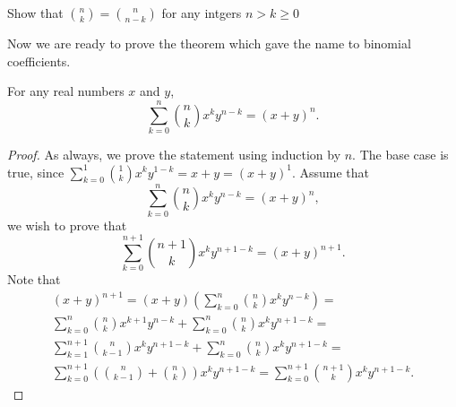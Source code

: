 \begin{exercise}
  Show that $\binom{n}{k} = \binom{n}{n - k}$ for any intgers $n > k \ge 0$
\end{exercise}


Now we are ready to prove the theorem which gave the name to binomial
coefficients.
\begin{theorem}
  For any real numbers $x$ and $y$,
    \[
      \sum_{k = 0}^n \binom{n}{k} x^k y^{n - k} = (x + y)^n.
    \]
\end{theorem}
\begin{proof}
  As always, we prove the statement using induction by $n$. The base case is
  true, since $\sum_{k = 0}^1 \binom{1}{k} x^k y^{1 - k} = x + y =
  (x + y)^1$. Assume that
  \[
    \sum_{k = 0}^n \binom{n}{k} x^k y^{n - k} = (x + y)^n,
  \]
  we wish to prove that
  \[
    \sum_{k = 0}^{n + 1} \binom{n + 1}{k} x^k y^{n + 1 - k} =
      (x + y)^{n + 1}.
  \]
  Note that
  \begin{multline*}
    (x + y)^{n + 1} = (x + y)
      \left(
        \sum_{k = 0}^n \binom{n}{k} x^k y^{n - k}
      \right) = \\
    \sum_{k = 0}^n \binom{n}{k} x^{k + 1} y^{n - k} +
      \sum_{k = 0}^n \binom{n}{k} x^{k} y^{n + 1 - k} = \\
    \sum_{k = 1}^{n + 1} \binom{n}{k - 1} x^k y^{n + 1 - k} +
      \sum_{k = 0}^n \binom{n}{k} x^k y^{n + 1 - k} = \\
    \sum_{k = 0}^{n + 1}
      \left(
        \binom{n}{k - 1} + \binom{n}{k}
      \right)
      x^k y^{n + 1 - k} =
    \sum_{k = 0}^{n + 1} \binom{n + 1}{k} x^k y^{n + 1 - k}.
  \end{multline*}
\end{proof}

